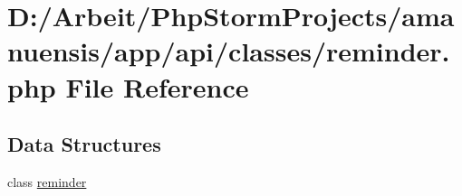 \hypertarget{reminder_8php}{}\section{D\+:/\+Arbeit/\+Php\+Storm\+Projects/amanuensis/app/api/classes/reminder.php File Reference}
\label{reminder_8php}
\subsection*{Data Structures}
\begin{DoxyCompactItemize}
\item 
class \hyperlink{classreminder}{reminder}
\end{DoxyCompactItemize}
